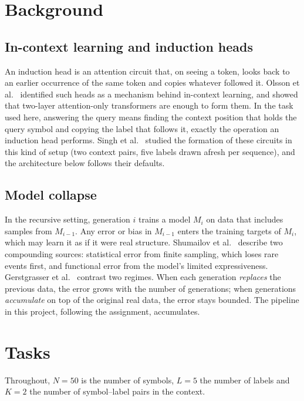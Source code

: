 \documentclass[11pt,a4paper]{article}
\begin{document}
\section{Background}

\subsection{In-context learning and induction heads}
An induction head is an attention circuit that, on seeing a token, looks back
to an earlier occurrence of the same token and copies whatever followed it.
Olsson et al.~\cite{olsson2022} identified such heads as a mechanism behind
in-context learning, and showed that two-layer attention-only transformers
are enough to form them. In the task used here, answering the query means
finding the context position that holds the query symbol and copying the
label that follows it, exactly the operation an induction head performs.
Singh et al.~\cite{singh2024} studied the formation of these circuits in this
kind of setup (two context pairs, five labels drawn afresh per sequence), and
the architecture below follows their defaults.

\subsection{Model collapse}
In the recursive setting, generation $i$ trains a model $M_i$ on data that
includes samples from $M_{i-1}$. Any error or bias in $M_{i-1}$ enters the
training targets of $M_i$, which may learn it as if it were real structure.
Shumailov et al.~\cite{shumailov2024} describe two compounding sources:
statistical error from finite sampling, which loses rare events first, and
functional error from the model's limited expressiveness. Gerstgrasser et
al.~\cite{gerstgrasser2024} contrast two regimes. When each generation
\emph{replaces} the previous data, the error grows with the number of
generations; when generations \emph{accumulate} on top of the original real
data, the error stays bounded. The pipeline in this project, following the
assignment, accumulates.

\section{Tasks}\label{sec:tasks}

Throughout, $N=50$ is the number of symbols, $L=5$ the number of labels and
$K=2$ the number of symbol--label pairs in the context.
\end{document}
